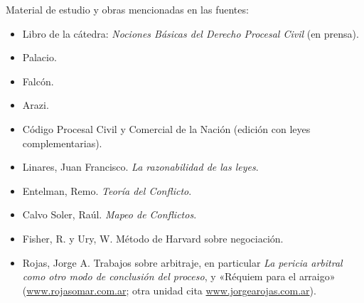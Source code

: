 \documentclass[12pt,oneside]{book}
\begin{document}
Material de estudio y obras mencionadas en las fuentes:

\begin{itemize}
\item Libro de la cátedra: \textit{Nociones Básicas del Derecho Procesal Civil} (en prensa).
\item Palacio.
\item Falcón.
\item Arazi.
\item Código Procesal Civil y Comercial de la Nación (edición con leyes complementarias).
\item Linares, Juan Francisco. \textit{La razonabilidad de las leyes}.
\item Entelman, Remo. \textit{Teoría del Conflicto}.
\item Calvo Soler, Raúl. \textit{Mapeo de Conflictos}.
\item Fisher, R. y Ury, W. Método de Harvard sobre negociación.
\item Rojas, Jorge A. Trabajos sobre arbitraje, en particular \textit{La pericia arbitral como otro modo de conclusión del proceso}, y «Réquiem para el arraigo» (\url{www.rojasomar.com.ar}; otra unidad cita \url{www.jorgearojas.com.ar}). %
\end{itemize}
\end{document}
